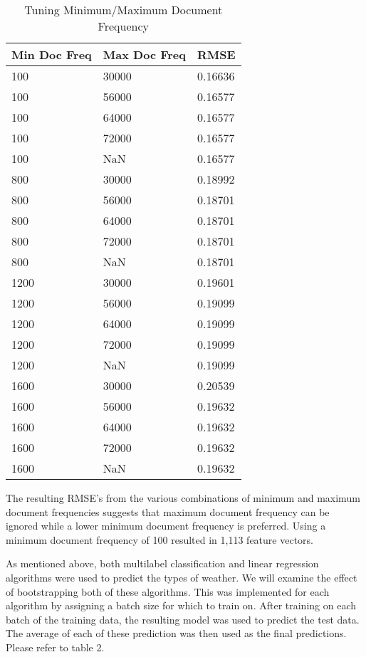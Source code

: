 \documentclass{article}
\begin{document}
\begin{table}[h]
\begin{center}
\begin{tabular}{ l | l | l }
Min Doc Freq & Max Doc Freq & RMSE    \\ \hline
100          & 30000        & 0.16636 \\
100          & 56000        & 0.16577 \\
100          & 64000        & 0.16577 \\
100          & 72000        & 0.16577 \\
100          & NaN          & 0.16577 \\
800          & 30000        & 0.18992 \\
800          & 56000        & 0.18701 \\
800          & 64000        & 0.18701 \\
800          & 72000        & 0.18701 \\
800          & NaN          & 0.18701 \\
1200         & 30000        & 0.19601 \\
1200         & 56000        & 0.19099 \\
1200         & 64000        & 0.19099 \\
1200         & 72000        & 0.19099 \\
1200         & NaN          & 0.19099 \\
1600         & 30000        & 0.20539 \\
1600         & 56000        & 0.19632 \\
1600         & 64000        & 0.19632 \\
1600         & 72000        & 0.19632 \\
1600         & NaN          & 0.19632
\end{tabular}
\caption{Tuning Minimum/Maximum Document Frequency}
\end{center}
\end{table}

The resulting RMSE's from the various combinations of minimum and maximum document frequencies suggests that maximum document frequency can be ignored while a lower minimum document frequency is preferred. Using a minimum document frequency of 100 resulted in 1,113 feature vectors.

As mentioned above, both multilabel classification and linear regression algorithms were used to predict the types of weather. We will examine the effect of bootstrapping both of these algorithms. This was implemented for each algorithm by assigning a batch size for which to train on. After training on each batch of the training data, the resulting model was used to predict the test data. The average of each of these prediction was then used as the final predictions. Please refer to table 2.
\end{document}
